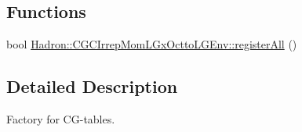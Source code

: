 \subsection*{Functions}
\begin{DoxyCompactItemize}
\item 
bool \mbox{\hyperlink{namespaceHadron_1_1CGCIrrepMomLGxOcttoLGEnv_a8e2a60d80852181dcdfbcef290164852}{Hadron\+::\+C\+G\+C\+Irrep\+Mom\+L\+Gx\+Octto\+L\+G\+Env\+::register\+All}} ()
\end{DoxyCompactItemize}


\subsection{Detailed Description}
Factory for C\+G-\/tables. 

